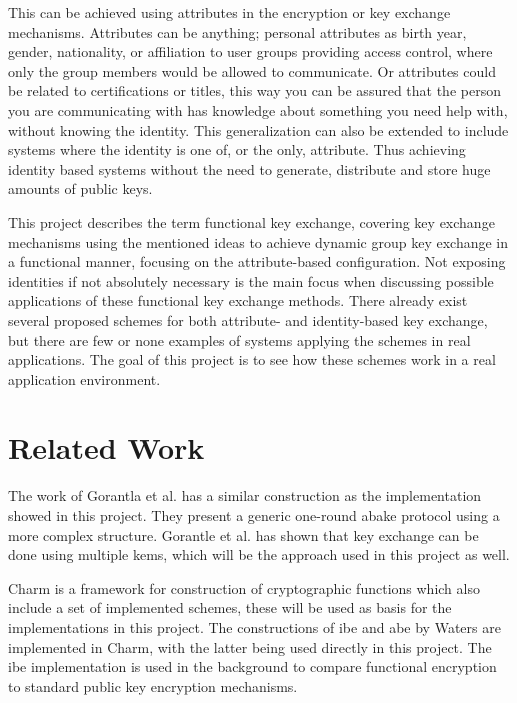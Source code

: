  \par This can be achieved using attributes in the encryption or key exchange mechanisms. Attributes can be anything; personal attributes as birth year, gender, nationality, or affiliation to user groups providing access control, where only the group members would be allowed to communicate. Or attributes could be related to certifications or titles, this way you can be assured that the person you are communicating with has knowledge about something you need help with, without knowing the identity. This generalization can also be extended to include systems where the identity is one of, or the only, attribute. Thus achieving identity based systems without the need to generate, distribute and store huge amounts of public keys. 
\par This project describes the term functional key exchange, covering key exchange mechanisms using the mentioned ideas to achieve dynamic group key exchange in a functional manner, focusing on the attribute-based configuration. Not exposing identities if not absolutely necessary is the main focus when discussing possible applications of these functional key exchange methods. There already exist several proposed schemes for both attribute- and identity-based key exchange, but there are few or none examples of systems applying the schemes in real applications. The goal of this project is to see how these schemes work in a real application environment.

\section{Related Work}\label{sec:related_work}
The work of Gorantla et al. \cite{gorantla2010attribute} has a similar construction as the implementation showed in this project. They present a generic one-round \gls{abake} protocol using a more complex structure. Gorantle et al. \cite{kem-group-ke} has shown that key exchange can be done using multiple \glspl{kem}, which will be the approach used in this project as well.
\par Charm \cite{DBLP:Charm13} is a framework for construction of cryptographic functions which also include a set of implemented schemes, these will be used as basis for the implementations in this project. The constructions of \gls{ibe} and \gls{abe} by Waters \cite{ibe_waters09, abe_waters09} are implemented in Charm, with the latter being used directly in this project. The \gls{ibe} implementation is used in the background to compare functional encryption to standard public key encryption mechanisms.

